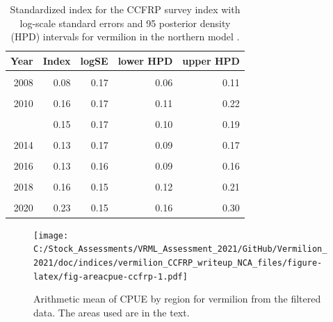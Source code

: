 \documentclass[
  english,
  a4paper,
]{article}
\begin{document}
\begin{table}

\caption{\label{tab:tab-index-ccfrp}Standardized index for the CCFRP survey index with log-scale standard errors and 95%
       posterior density (HPD) intervals for vermilion in the northern model .}
\centering
\begin{tabular}[t]{rrrrr}
\toprule
Year & Index & logSE & lower HPD & upper HPD\\
\midrule
\cellcolor{gray!6}{2007} & \cellcolor{gray!6}{0.09} & \cellcolor{gray!6}{0.18} & \cellcolor{gray!6}{0.06} & \cellcolor{gray!6}{0.13}\\
2008 & 0.08 & 0.17 & 0.06 & 0.11\\
\cellcolor{gray!6}{2009} & \cellcolor{gray!6}{0.14} & \cellcolor{gray!6}{0.17} & \cellcolor{gray!6}{0.09} & \cellcolor{gray!6}{0.18}\\
2010 & 0.16 & 0.17 & 0.11 & 0.22\\
\cellcolor{gray!6}{2011} & \cellcolor{gray!6}{0.14} & \cellcolor{gray!6}{0.17} & \cellcolor{gray!6}{0.10} & \cellcolor{gray!6}{0.19}\\
\addlinespace
2012 & 0.15 & 0.17 & 0.10 & 0.19\\
\cellcolor{gray!6}{2013} & \cellcolor{gray!6}{0.07} & \cellcolor{gray!6}{0.18} & \cellcolor{gray!6}{0.05} & \cellcolor{gray!6}{0.10}\\
2014 & 0.13 & 0.17 & 0.09 & 0.17\\
\cellcolor{gray!6}{2015} & \cellcolor{gray!6}{0.17} & \cellcolor{gray!6}{0.18} & \cellcolor{gray!6}{0.11} & \cellcolor{gray!6}{0.23}\\
2016 & 0.13 & 0.16 & 0.09 & 0.16\\
\addlinespace
\cellcolor{gray!6}{2017} & \cellcolor{gray!6}{0.13} & \cellcolor{gray!6}{0.15} & \cellcolor{gray!6}{0.09} & \cellcolor{gray!6}{0.17}\\
2018 & 0.16 & 0.15 & 0.12 & 0.21\\
\cellcolor{gray!6}{2019} & \cellcolor{gray!6}{0.19} & \cellcolor{gray!6}{0.15} & \cellcolor{gray!6}{0.14} & \cellcolor{gray!6}{0.25}\\
2020 & 0.23 & 0.15 & 0.16 & 0.30\\
\bottomrule
\end{tabular}
\end{table}

\FloatBarrier

\begin{figure}
\centering
\texttt{[image: C:/Stock\_Assessments/VRML\_Assessment\_2021/GitHub/Vermilion\_2021/doc/indices/vermilion\_CCFRP\_writeup\_NCA\_files/figure-latex/fig-areacpue-ccfrp-1.pdf]}
\caption{\label{fig:fig-areacpue-ccfrp}Arithmetic mean of CPUE by region for vermilion from the filtered data. The areas used are in the text.}
\end{figure}
\end{document}
